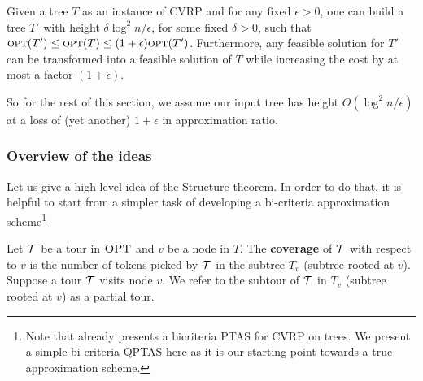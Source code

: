 \documentclass[twoside,leqno]{article}
\newcommand{\calT}{{\cal T}}
\newcommand{\opt}{\mbox{\sc opt}}
\newcommand{\OPT}{\mbox{\sc OPT}}
\newcommand{\eps}{\epsilon}
\begin{document}
\begin{theorem}\label{thm:height-red}
Given a tree $T$ as an instance of CVRP and for any fixed $\epsilon>0$, one can build a tree $T'$ with height $\delta\log^2 n/\epsilon$, for some fixed $\delta>0$, such that $\opt(T')\leq \opt(T)\leq (1+\epsilon)\opt(T')$. Furthermore, any feasible solution for $T'$ can be transformed into a feasible solution of $T$ while increasing the cost by at most a factor $(1+\epsilon)$.
\end{theorem}

So for the rest of this section, we assume our input tree has height $O(\log^2 n/\eps)$ at a loss of (yet another) $1+\eps$ in
approximation ratio.

\subsubsection{Overview of the ideas}
Let us give a high-level idea of the Structure theorem. In order to do that, it is helpful to start from a simpler task of developing a bi-criteria approximation scheme\footnote{Note that \cite{Becker-Paul-Bricriteria} already presents a bicriteria PTAS for CVRP on trees.
We present a simple bi-criteria QPTAS here as it is our starting point towards a true approximation scheme.}


Let $\calT$ be a tour in $\OPT$ and $v$ be a node in $T$. The \textbf{coverage} of $\calT$ with respect to $v$ is the number of tokens picked by $\calT$ in the subtree $T_v$ (subtree rooted at $v$).
Suppose a tour $\calT$ visits node $v$. We refer to the subtour of $\calT$ in $T_v$ (subtree rooted at $v$) as a partial tour.

\end{document}

